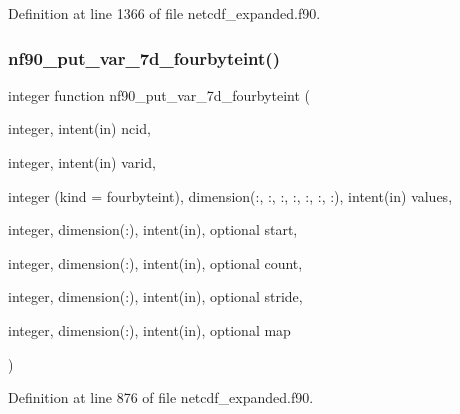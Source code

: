 Definition at line 1366 of file netcdf\+\_\+expanded.\+f90.

\mbox{\label{netcdf__expanded_8f90_acc0d60f3dfd87872c5709daa7d63cdf1}} 
\subsubsection{\texorpdfstring{nf90\+\_\+put\+\_\+var\+\_\+7d\+\_\+fourbyteint()}{nf90\_put\_var\_7d\_fourbyteint()}}
{\footnotesize\ttfamily integer function nf90\+\_\+put\+\_\+var\+\_\+7d\+\_\+fourbyteint (\begin{DoxyParamCaption}\item[{integer, intent(in)}]{ncid,  }\item[{integer, intent(in)}]{varid,  }\item[{integer (kind = fourbyteint), dimension(\+:, \+:, \+:, \+:, \+:, \+:, \+:), intent(in)}]{values,  }\item[{integer, dimension(\+:), intent(in), optional}]{start,  }\item[{integer, dimension(\+:), intent(in), optional}]{count,  }\item[{integer, dimension(\+:), intent(in), optional}]{stride,  }\item[{integer, dimension(\+:), intent(in), optional}]{map }\end{DoxyParamCaption})}



Definition at line 876 of file netcdf\+\_\+expanded.\+f90.

\mbox{\label{netcdf__expanded_8f90_a01f9cc3fed62c2b4aafd6aa65e5b38c3}} 
